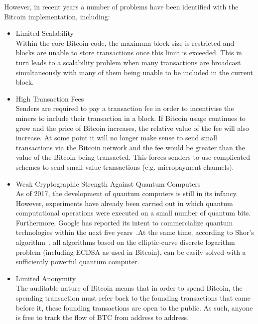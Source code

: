 \documentclass[a4paper,10pt,twocolumn]{article}
\begin{document}
However, in recent years a number of problems have been identified with the Bitcoin implementation, including:
\vspace{-0.5\baselineskip}
\begin{itemize}
	\setlength\itemsep{0em}
	\item{Limited Scalability}\mbox{}\\ 
	Within the core Bitcoin code, the maximum block size is restricted and blocks are unable to store transactions once this limit 
	is exceeded. This in turn leads to a scalability problem when many transactions are broadcast simultaneously with many of them 
	being unable to be included in the current block.
	\item{High Transaction Fees}\mbox{}\\ 
	Senders are required to pay a transaction fee in order to incentivise the miners to include their transaction in a block.
	If Bitcoin usage continues to grow and the price of Bitcoin increases, the relative value of the fee will also increase. At some
	point it will no longer make sense to send small transactions via the Bitcoin network and the fee would be greater than the 
	value of the Bitcoin being transacted. This forces senders to use complicated schemes to send small value transactions (e.g. 
	micropayment channels).
	\item{Weak Cryptographic Strength Against Quantum Computers}\\ 
	As of 2017, the development of quantum computers is still in its infancy. However, experiments have already been carried out in 
	which quantum computational operations were executed on a small number of quantum bits. Furthermore, Google has reported its 
	intent to commercialize quantum technologies within the next five years~\cite{google}.At the same time, according to Shor's 
	algorithm~\cite{shor}, all algorithms based on the elliptic-curve discrete logarithm problem (including ECDSA as used in 
	Bitcoin), can be easily solved with a sufficiently powerful quantum computer. 
	\item{Limited Anonymity}\mbox{}\\ 
	The auditable nature of Bitcoin means that in order to spend Bitcoin, the spending transaction must refer back to the founding
	transactions that came before it, these founding transactions are open to the public. As such, anyone is free to track the flow
	of BTC from address to address.
\end{itemize}
\end{document}
